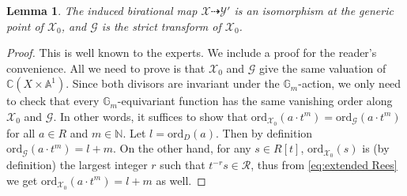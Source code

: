 \documentclass[12pt]{amsart}
\newtheorem{lem}[prop]{Lemma}
\theoremstyle{definition}
\newcommand{\bC}{\mathbb{C}}
\newcommand{\bA}{\mathbb{A}}
\newcommand{\bQ}{\mathbb{Q}}
\newcommand{\bN}{\mathbb{N}}
\newcommand{\bG}{\mathbb{G}}
\newcommand{\cR}{\mathcal{R}}
\newcommand{\scX}{\mathscr{X}}
\newcommand{\scY}{\mathscr{Y}}
\newcommand{\scD}{\mathscr{D}}
\newcommand{\scG}{\mathscr{G}}
\newcommand{\ord}{\mathrm{ord}}
\numberwithin{equation}{section}
\begin{document}

\begin{lem} \label{lem:tc bir construction}
The induced birational map $\scX\dashrightarrow \scY'$ is an isomorphism at the generic point of $\scX_0$, and $\mathscr{G}$ is the strict transform of $\scX_0$.
\end{lem}

\begin{proof}
This is well known to the experts. We include a proof for the reader's convenience. All we need to prove is that $\scX_0$ and $\scG$ give the same valuation of $\bC(X\times \bA^1)$. Since both divisors are invariant under the $\bG_m$-action, we only need to check that every $\bG_m$-equivariant function has the same vanishing order along $\scX_0$ and $\scG$. In other words, it suffices to show that $\ord_{\scX_0}(a\cdot t^m)=\ord_{\scG}(a\cdot t^m)$ for all $a\in R$ and $m\in\bN$. Let $l=\ord_D(a)$. Then by definition $\ord_{\scG}(a\cdot t^m) = l+m$. On the other hand, for any $s\in R[t]$, $\ord_{\scX_0}(s)$ is (by definition) the largest integer $r$ such that $t^{-r}s\in \cR$, thus from \eqref{eq:extended Rees} we get $\ord_{\scX_0}(a\cdot t^m) = l+m$ as well.
\end{proof}


\end{document}
